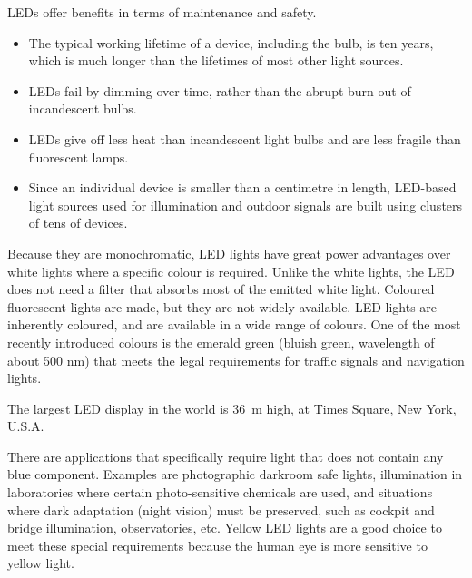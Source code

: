 LEDs offer benefits in terms of maintenance and safety.

\begin{itemize}
\item The typical working lifetime of a device, including the bulb, is ten years, which is much longer than the lifetimes of most other light sources.
\item LEDs fail by dimming over time, rather than the abrupt burn-out of incandescent bulbs.
\item LEDs give off less heat than incandescent light bulbs and are less fragile than fluorescent lamps.
\item Since an individual device is smaller than a centimetre in length, LED-based light sources used for illumination and outdoor signals are built using clusters of tens of devices.
\end{itemize}

Because they are monochromatic, LED lights have great power advantages over white lights where a specific colour is required. Unlike the white lights, the LED does not need a filter that absorbs most of the emitted white light. Coloured fluorescent lights are made, but they are not widely available. LED lights are inherently coloured, and are available in a wide range of colours. One of the most recently introduced colours is the emerald green (bluish green, wavelength of about 500 nm) that meets the legal requirements for traffic signals and navigation lights. 

\begin{IFact}{The largest LED display in the world is 36~m high, at Times Square, New York, U.S.A.}
\end{IFact}

There are applications that specifically require light that does not contain any blue component. Examples are photographic darkroom safe lights, illumination in laboratories where certain photo-sensitive chemicals are used, and situations where dark adaptation (night vision) must be preserved, such as cockpit and bridge illumination, observatories, etc. Yellow LED lights are a good choice to meet these special requirements because the human eye is more sensitive to yellow light.



